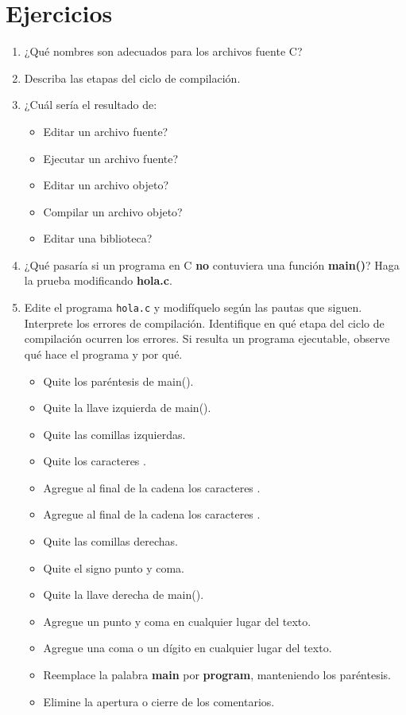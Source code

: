 \section{Ejercicios}
\begin{enumerate}
	\item ¿Qué nombres son adecuados para los archivos fuente C? 
	\item Describa las etapas del ciclo de compilación.
	\item ¿Cuál sería el resultado de: 
		\begin{itemize}
		\item Editar un archivo fuente? 
		\item Ejecutar un archivo fuente? 
		\item Editar un archivo objeto? 
		\item Compilar un archivo objeto? 
		\item Editar una biblioteca?
		\end{itemize}
	\item ¿Qué pasaría si un programa en C \textbf{no} contuviera una función \textbf{main()}? Haga la prueba modificando \textbf{hola.c}.
	\item Edite el programa \lstinline{hola.c} y modifíquelo según las pautas que siguen. Interprete los errores de compilación. Identifique en qué etapa del ciclo de compilación ocurren los errores. Si resulta un programa ejecutable, observe qué hace el programa y por qué. 
		\begin{itemize}
		\item Quite los paréntesis de main(). 
		\item Quite la llave izquierda de main().
		\item Quite las comillas izquierdas.
		\item Quite los caracteres .
		\item Agregue al final de la cadena los caracteres .
		\item Agregue al final de la cadena los caracteres .
		\item Quite las comillas derechas.
		\item Quite el signo punto y coma. 
		\item Quite la llave derecha de main().
		\item Agregue un punto y coma en cualquier lugar del texto.
		\item Agregue una coma o un dígito en cualquier lugar del texto. 
		\item Reemplace la palabra \textbf{main} por \textbf{program}, manteniendo los paréntesis. 
		\item Elimine la apertura o cierre de los comentarios.
		\end{itemize}
\end{enumerate}

